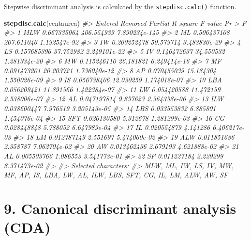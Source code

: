 \documentclass[
]{article}
\newenvironment{Shaded}{\begin{snugshade}}{\end{snugshade}}
\newcommand{\CommentTok}[1]{\textcolor[rgb]{0.56,0.35,0.01}{\textit{#1}}}
\newcommand{\KeywordTok}[1]{\textcolor[rgb]{0.13,0.29,0.53}{\textbf{#1}}}
\newcommand{\NormalTok}[1]{#1}
\begin{document}
Stepwise discriminant analysis is calculated by the
\texttt{stepdisc.calc()} function.

\begin{Shaded}
\begin{Highlighting}[]
\KeywordTok{stepdisc.calc}\NormalTok{(centaurea)}
\CommentTok{#>    Entered Removed Partial R-square    F-value        Pr > F}
\CommentTok{#> 1      MLW              0.667335064 406.554939 7.890234e-145}
\CommentTok{#> 2       ML              0.506437108 207.611046  1.192547e-92}
\CommentTok{#> 3       IW              0.200252478  50.579714  3.483830e-29}
\CommentTok{#> 4       LS              0.157685396  37.752982  2.249101e-22}
\CommentTok{#> 5       IV              0.146472637  34.550532  1.281334e-20}
\CommentTok{#> 6       MW              0.115246110  26.181821  6.249414e-16}
\CommentTok{#> 7       MF              0.091473201  20.203721  1.736040e-12}
\CommentTok{#> 8       AP              0.070455039  15.184304  1.550026e-09}
\CommentTok{#> 9       IS              0.056738406  12.030259  1.174018e-07}
\CommentTok{#> 10     LBA              0.056209421  11.891566  1.422384e-07}
\CommentTok{#> 11      LW              0.054420588  11.472159  2.538006e-07}
\CommentTok{#> 12      AL              0.047197814   9.857623  2.364358e-06}
\CommentTok{#> 13     ILW              0.038600447   7.976519  3.205143e-05}
\CommentTok{#> 14     LBS              0.033553832   6.885891  1.454076e-04}
\CommentTok{#> 15     SFT              0.026130580   5.312678  1.281299e-03}
\CommentTok{#> 16      CG              0.028448848   5.788052  6.647989e-04}
\CommentTok{#> 17      IL              0.020554879   4.141286  6.406217e-03}
\CommentTok{#> 18      LM              0.012787149   2.551697  5.474060e-02}
\CommentTok{#> 19     ALW              0.011851686   2.358787  7.062704e-02}
\CommentTok{#> 20      AW              0.013462436   2.679193  4.621888e-02}
\CommentTok{#> 21              AL      0.005503766   1.086553  3.541773e-01}
\CommentTok{#> 22      SF              0.011227184   2.229299  8.371473e-02}
\CommentTok{#> }
\CommentTok{#> Selected characters:}
\CommentTok{#> MLW, ML, IW, LS, IV, MW, MF, AP, IS, LBA, LW, AL, ILW, LBS, SFT, CG, IL, LM, ALW, AW, SF}
\end{Highlighting}
\end{Shaded}

\newpage

\hypertarget{canonical-discriminant-analysis-cda}{%
\section{9. Canonical discriminant analysis
(CDA)}\label{canonical-discriminant-analysis-cda}}
\end{document}
